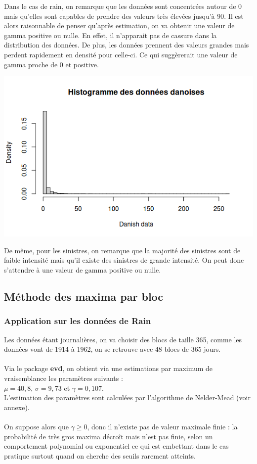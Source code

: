 \documentclass{article}
\theoremstyle{plain}
\theoremstyle{definition}
\theoremstyle{plain}
\begin{document}
Dans le cas de rain, on remarque que les données sont concentrées autour de 0 mais qu'elles sont capables de prendre des valeurs très élevées jusqu'à 90.
Il est alors raisonnable de penser qu'après estimation, on va obtenir une valeur de gamma positive ou nulle. En effet, il n'apparait pas de cassure dans la distribution des données.
De plus, les données prennent des valeurs grandes mais perdent rapidement en densité pour celle-ci. Ce qui suggèrerait une valeur de gamma proche de $0$ et positive.

\begin{center}
	\includegraphics[scale=0.70]{./images/sinistres.png} 
\end{center}

De même, pour les sinistres, on remarque que la majorité des sinistres sont de faible intensité mais qu'il existe des sinistres de grande intensité. On peut donc s'attendre à une valeur de gamma positive ou nulle.

\subsection{Méthode des maxima par bloc}

\subsubsection{Application sur les données de Rain}

Les données étant journalières, on va choisir des blocs de taille 365, comme les données vont de 1914 à 1962, on se retrouve avec 48 blocs de 365 jours.
\\
\\
Via le package \textbf{evd}, on obtient via une estimations par maximum de vraisemblance les paramètres suivants :
\\
$\mu = 40,8$, $\sigma = 9,73$ et $\gamma = 0,107$.
\\
L'estimation des paramètres sont calculées par l'algorithme de Nelder-Mead (voir annexe).
\\
\\
On suppose alors que $\gamma \geq 0$, donc il n’existe pas de valeur maximale finie : la probabilité de très gros maxima décroît mais n'est pas finie, selon un comportement polynomial ou exponentiel ce qui est embettant dans le cas pratique surtout quand on cherche des seuils rarement atteints.
\end{document}
